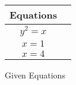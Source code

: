 \begin{tabular}[12pt]{ |c| c|}
    \hline
    \textbf{Equations}\\ 
    \hline
     $y^2=x$ \\
    \hline 
     $x=1$\\
    \hline
     $x=4$\\
     \hline
    \end{tabular}
    \caption{Given Equations}
